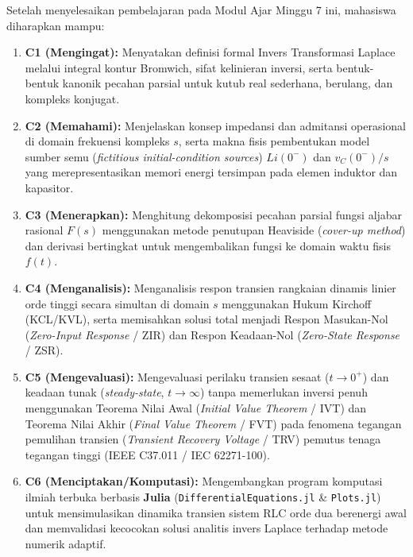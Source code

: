 \documentclass[11pt,a4paper]{article}
\theoremstyle{definition}
\begin{document}
\begin{tcolorbox}[colback=blue!5!white,colframe=headercolor,title=\textbf{Capaian Pembelajaran Khusus (Sub-CPMK 4)}]
Setelah menyelesaikan pembelajaran pada Modul Ajar Minggu 7 ini, mahasiswa diharapkan mampu:
\begin{enumerate}[leftmargin=*]
    \item \textbf{C1 (Mengingat):} Menyatakan definisi formal Invers Transformasi Laplace melalui integral kontur Bromwich, sifat kelinieran inversi, serta bentuk-bentuk kanonik pecahan parsial untuk kutub real sederhana, berulang, dan kompleks konjugat.
    \item \textbf{C2 (Memahami):} Menjelaskan konsep impedansi dan admitansi operasional di domain frekuensi kompleks $s$, serta makna fisis pembentukan model sumber semu (\textit{fictitious initial-condition sources}) $L i(0^-)$ dan $v_C(0^-)/s$ yang merepresentasikan memori energi tersimpan pada elemen induktor dan kapasitor.
    \item \textbf{C3 (Menerapkan):} Menghitung dekomposisi pecahan parsial fungsi aljabar rasional $F(s)$ menggunakan metode penutupan Heaviside (\textit{cover-up method}) dan derivasi bertingkat untuk mengembalikan fungsi ke domain waktu fisis $f(t)$.
    \item \textbf{C4 (Menganalisis):} Menganalisis respon transien rangkaian dinamis linier orde tinggi secara simultan di domain $s$ menggunakan Hukum Kirchoff (KCL/KVL), serta memisahkan solusi total menjadi Respon Masukan-Nol (\textit{Zero-Input Response} / ZIR) dan Respon Keadaan-Nol (\textit{Zero-State Response} / ZSR).
    \item \textbf{C5 (Mengevaluasi):} Mengevaluasi perilaku transien sesaat ($t \to 0^+$) dan keadaan tunak (\textit{steady-state}, $t \to \infty$) tanpa memerlukan inversi penuh menggunakan Teorema Nilai Awal (\textit{Initial Value Theorem} / IVT) dan Teorema Nilai Akhir (\textit{Final Value Theorem} / FVT) pada fenomena tegangan pemulihan transien (\textit{Transient Recovery Voltage} / TRV) pemutus tenaga tegangan tinggi (IEEE C37.011 / IEC 62271-100).
    \item \textbf{C6 (Menciptakan/Komputasi):} Mengembangkan program komputasi ilmiah terbuka berbasis \textbf{Julia} (\texttt{DifferentialEquations.jl} \& \texttt{Plots.jl}) untuk mensimulasikan dinamika transien sistem RLC orde dua berenergi awal dan memvalidasi kecocokan solusi analitis invers Laplace terhadap metode numerik adaptif.
\end{enumerate}
\end{tcolorbox}
\end{document}
